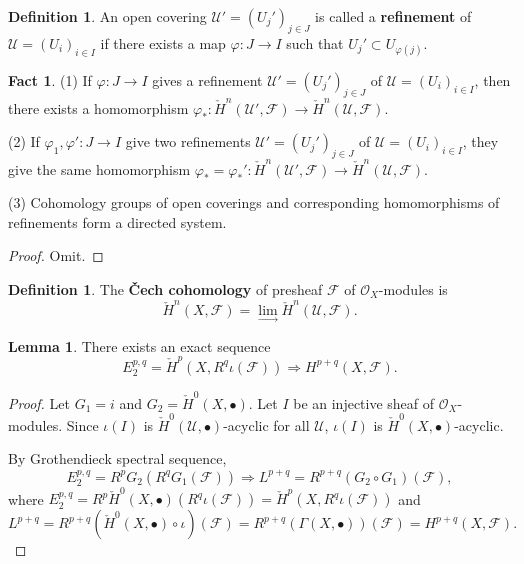 \documentclass{amsart}
\numberwithin{equation}{section}
\theoremstyle{plain}
\theoremstyle{definition}
\newtheorem{lem}[equation]{Lemma}
\newtheorem{defn}[equation]{Definition}
\newtheorem{fact}[equation]{Fact}
\begin{document}
\begin{defn}
	An open covering $ \mathscr U'=(U_j')_{j\in J} $ is called a \textbf{refinement} of $ \mathscr U=(U_i)_{i\in I} $ if there exists a map $\varphi: J\to I $ such that $ U_{j}'\subset U_{\varphi(j)} $. 
\end{defn}

\begin{fact}
	(1) If $ \varphi:J\to I $ gives a {refinement} $ \mathscr U'=(U_j')_{j\in J} $ of $ \mathscr U=(U_i)_{i\in I} $, then there exists a homomorphism $ \varphi_*: \check{H}^n(\mathscr U', \mathscr F)\to \check{H}^n(\mathscr U, \mathscr F) $. 
	
	(2) If $ \varphi_1,\varphi':J\to I $ give two {refinements} $ \mathscr U'=(U_j')_{j\in J} $ of $ \mathscr U=(U_i)_{i\in I} $, they give the same homomorphism $ \varphi_*=\varphi_*': \check{H}^n(\mathscr U', \mathscr F)\to \check{H}^n(\mathscr U, \mathscr F) $. 
	
	(3) Cohomology groups of open coverings and corresponding homomorphisms of refinements form a directed system. 
\end{fact}

\begin{proof}
	Omit.
\end{proof}

\begin{defn}
	The \textbf{\v{C}ech cohomology} of presheaf $ \mathscr F $ of $ \mathcal O_X $-modules is $$ \check{H}^n(X,\mathscr F)=\lim\limits_{\longrightarrow} \check{H}^n(\mathscr U, \mathscr F) .$$ 
\end{defn}

\begin{lem}\label{3.7}
	There exists an exact sequence 
	\[E_2^{p,q}=\check{H}^p(X, R^q\iota (\mathscr F))\Rightarrow H^{p+q}(X, \mathscr F).\]
\end{lem}

\begin{proof}
	Let $ G_1=i $ and $ G_2=\check{H}^0(X, \bullet)$. 
	Let $ I $ be an injective sheaf of $ \mathcal O_X $-modules. 
	Since $ \iota(I) $ is $ \check{H}^0(\mathscr U, \bullet) $-acyclic for all $ \mathscr U $, $ \iota(I) $ is $ \check{H}^0(X, \bullet) $-acyclic. 
	
	By Grothendieck spectral sequence, $$ E_2^{p,q}=R^pG_2(R^qG_1(\mathscr F))\Rightarrow L^{p+q}=R^{p+q}(G_2\circ G_1)(\mathscr F), $$
	where $ E_2^{p,q}=R^p\check{H}^0(X, \bullet)(R^q\iota(\mathscr F))=\check{H}^p(X, R^q\iota (\mathscr F))$ and 	
	$$ L^{p+q}=R^{p+q}(\check{H}^0(X, \bullet)\circ\iota)(\mathscr F)=R^{p+q}(\Gamma(X,\bullet))(\mathscr F)=H^{p+q}(X,\mathscr F).$$
\end{proof}
\end{document}
